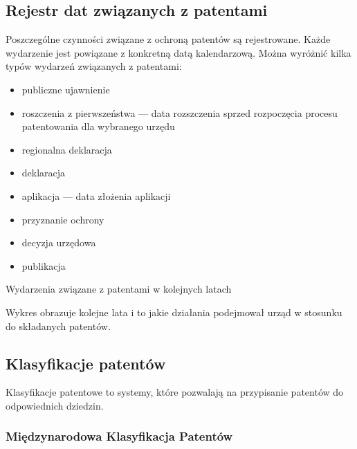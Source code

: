 \newpage

\subsection{Rejestr dat związanych z patentami}

Poszczególne czynności związane z ochroną patentów są rejestrowane.
Każde wydarzenie jest powiązane z konkretną datą kalendarzową.
Można wyróżnić kilka typów wydarzeń związanych z patentami:

\begin{itemize}
\item publiczne ujawnienie 
\item roszczenia z pierwszeństwa  --- 
      data rozszczenia sprzed rozpoczęcia procesu patentowania dla wybranego urzędu
\item regionalna deklaracja 
\item deklaracja 
\item aplikacja  --- data złożenia aplikacji
\item przyznanie ochrony 
\item decyzja urzędowa
\item publikacja
\end{itemize}

\newpage

  {Wydarzenia związane z patentami w kolejnych latach}

Wykres obrazuje kolejne lata i to jakie
działania podejmował urząd w stosunku do składanych patentów.

\newpage



\newpage
\subsection{Klasyfikacje patentów}

Klasyfikacje patentowe to systemy, które pozwalają na przypisanie
patentów do odpowiednich dziedzin.

\subsubsection{Międzynarodowa Klasyfikacja Patentów}

